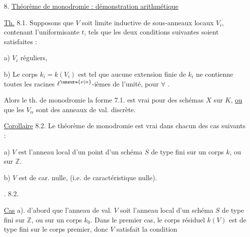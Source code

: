 8. \uline{Théorème de monodromie : démonstration arithmétique}

\uline{Th.} 8.1. Supposons que $V$ soit limite inductive  de sous-anneaux locaux $V_i$,   contenant l'uniformisante $t$, tels que les deux conditions suivantes soient satisfaites :

a)  $V_i$   réguliers,  

b) Le corps  $k_i=k(V_i)$ est tel que aucune extension finie de $k_i$ ne contienne toutes les racines $\ell^{\unsure{\nu|n}}$-ièmes de l'unité, pour $\forall$ .

Alors le th. de monodromie  la forme 7.1. est vrai pour des schémas   $X$ sur $K$,    \uline{ou} que les $V_\alpha$ sont des anneaux de val. discrète.

\uline{Corollaire} 8.2. Le théorème de monodromie  est vrai   dans chacun des cas suivants :

a) $V$ est  l'anneau local d'un point d'un schéma $S$ de type fini sur un corps $k$, ou sur   $\mathbb Z$.

b) $V$ est de car. nulle, (i.e.  de caractéristique  nulle).

. 8.2.

\uline{Cas} a). 
 d'abord que l'anneau de val.  $V$ soit l'anneau local d'un schéma $S$ de type fini sur   $\mathbb Z$, ou sur un corps $k_0$. Dans le premier cas,  le corps résiduel $k(V)$ est de type fini sur le corps premier, donc $V$ satisfait la condition

